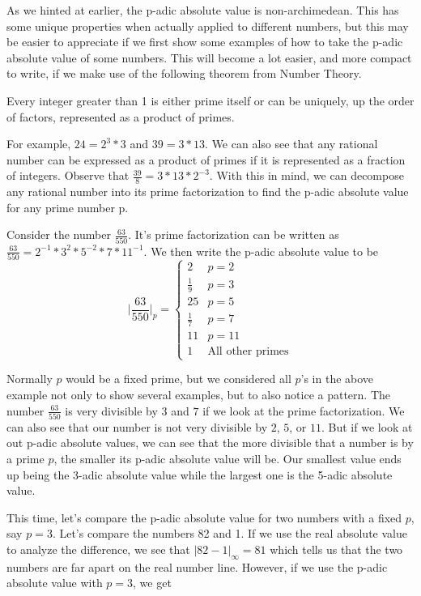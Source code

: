 \documentclass[a4paper]{article}
\begin{document}
As we hinted at earlier, the p-adic absolute value is non-archimedean. 
This has some unique properties when actually
applied to different numbers, but this may be easier to appreciate
if we first show some examples of how to take the p-adic absolute
value of some numbers.  This will become a lot easier, and more
compact to write, if we make use of the following theorem from Number 
Theory.

\begin{theorem}
Every integer greater than 1 is either prime itself or can be
uniquely, up the order of factors, represented as a product of
primes.
\end{theorem}

For example, \(24=2^3*3\) and \(39=3*13\).  We can also see that
any rational number can be expressed as a product of primes if it
is represented as a fraction of integers.  Observe that 
\(\frac{39}{8}=3*13*2^{-3}\).  With this in mind, we can decompose any
rational number into its prime factorization to find the p-adic
absolute value for any prime number p.

Consider the number \(\frac{63}{550}\).  It's prime factorization
can be written as \(\frac{63}{550}=2^{-1}*3^2*5^{-2}*7*11^{-1}\).  We
then write the p-adic absolute value to be
\[
	\Big|\frac{63}{550}\Big|_p=
    \begin{cases}
      2 & p=2\\
      \frac{1}{9} & p=3\\
      25 & p=5\\
      \frac{1}{7} & p=7\\
      11 & p=11\\
      1 & \text{All other primes}
	\end{cases}
\]

Normally $p$ would be a fixed prime, but we considered all $p$'s
in the above example not only to show several examples, but to
also notice a pattern.  The number $\frac{63}{550}$ is very divisible 
by $3$ and $7$ if we look at the prime factorization.  We can also see 
that our number is not very divisible by $2$, $5$, or $11$.  But if we 
look at out p-adic absolute values, we can see that the more divisible 
that a number is by a prime $p$, the smaller its p-adic absolute 
value will be.  Our smallest value ends up being the 3-adic absolute 
value while the largest one is the 5-adic absolute value.

This time, let's compare the p-adic absolute value for two numbers
with a fixed $p$, say $p=3$.  Let's compare the numbers 82 and
1.  If we use the real absolute value to analyze the 
difference, we see that \(|82-1|_\infty=81\) which tells us that 
the two numbers are far apart on the real number line.  
However, if we use the p-adic absolute value with $p=3$, we get 
\end{document}
